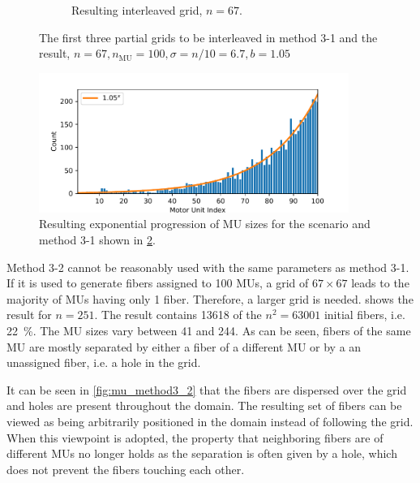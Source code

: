 \begin{figure}
\begin{subfigure}[t]{0.48\textwidth}
    \caption{Resulting interleaved grid, $n=67$.}%
    \label{fig:mu_3_1}%
  \end{subfigure}
  \caption{The first three partial grids to be interleaved in method 3-1 and the result, $n=67, n_\text{MU}=100, \sigma = n/10 = 6.7, b=1.05$}%
  \label{fig:mu_method3_partial}%
\end{figure}%


\begin{figure}%
  \centering
  \includegraphics[width=0.9\textwidth]{images/motor_unit_assignment/MU_fibre_distribution_combined_67x67_100_fiber_distribution.pdf}%
  \caption{Resulting exponential progression of MU sizes for the scenario and method 3-1 shown in \cref{fig:mu_method3_partial}.}%
  \label{fig:mu_method3_distribution}%
\end{figure}%

Method 3-2 cannot be reasonably used with the same parameters as method 3-1. If it is used to generate fibers assigned to 100 MUs, a grid of $67 \times 67$ leads to the majority of MUs having only 1 fiber. Therefore, a larger grid is needed.  shows the result for $n=251$. The result contains \num{13618} of the $n^2 = \num{63001}$ initial fibers, i.e. \SI{22}{\percent}. The MU sizes vary between \num{41} and \num{244}. As can be seen, fibers of the same MU are mostly separated by either a fiber of a different MU or by a an unassigned fiber, i.e. a hole in the grid.

It can be seen in \cref{fig:mu_method3_2} that the fibers are dispersed over the grid and holes are present throughout the domain. The resulting set of fibers can be viewed as being arbitrarily positioned in the domain instead of following the grid. When this viewpoint is adopted, the property that neighboring fibers are of different MUs no longer holds as the separation is often given by a hole, which does not prevent the fibers touching each other.

